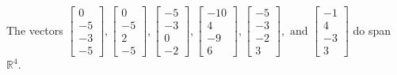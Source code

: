 \begin{exercise}
\begin{exerciseStatement}
  \end{exerciseStatement}
  \begin{exerciseAnswer}
   The vectors \(\left[\begin{array}{r}
0 \\
-5 \\
-3 \\
-5
\end{array}\right] , \left[\begin{array}{r}
0 \\
-5 \\
2 \\
-5
\end{array}\right] , \left[\begin{array}{r}
-5 \\
-3 \\
0 \\
-2
\end{array}\right] , \left[\begin{array}{r}
-10 \\
4 \\
-9 \\
6
\end{array}\right] , \left[\begin{array}{r}
-5 \\
-3 \\
-2 \\
3
\end{array}\right] , \text{ and } \left[\begin{array}{r}
-1 \\
4 \\
-3 \\
3
\end{array}\right]\) 
  	 do  
	span \(\mathbb{R}^4\).
  


  \end{exerciseAnswer}
\end{exercise}